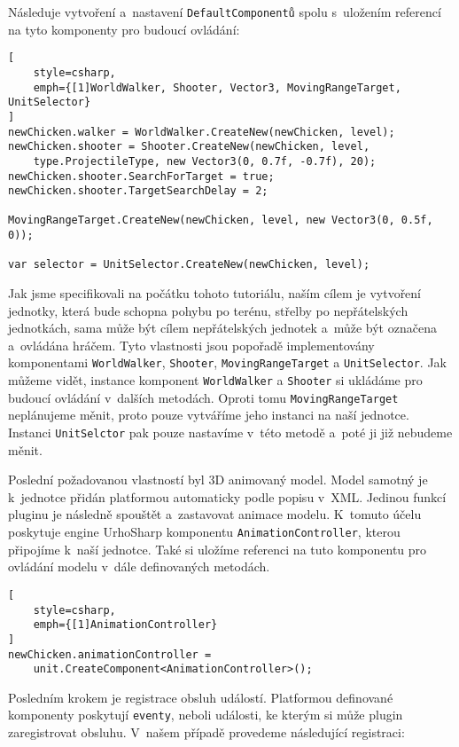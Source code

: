 Následuje vytvoření a~nastavení \texttt{DefaultComponentů} spolu s~uložením referencí na tyto komponenty pro budoucí ovládání:

\begin{lstlisting}[
	style=csharp,
	emph={[1]WorldWalker, Shooter, Vector3, MovingRangeTarget, UnitSelector}
]
newChicken.walker = WorldWalker.CreateNew(newChicken, level);
newChicken.shooter = Shooter.CreateNew(newChicken, level,
	type.ProjectileType, new Vector3(0, 0.7f, -0.7f), 20);
newChicken.shooter.SearchForTarget = true;
newChicken.shooter.TargetSearchDelay = 2;

MovingRangeTarget.CreateNew(newChicken, level, new Vector3(0, 0.5f, 0));

var selector = UnitSelector.CreateNew(newChicken, level);
\end{lstlisting}

Jak jsme specifikovali na počátku tohoto tutoriálu, naším cílem je vytvoření jednotky, která bude schopna pohybu po terénu, střelby po nepřátelských jednotkách, sama může být cílem nepřátelských jednotek a~může být označena a~ovládána hráčem. Tyto vlastnosti jsou popořadě implementovány komponentami \texttt{WorldWalker}, \texttt{Shooter}, \texttt{MovingRangeTarget} a \texttt{UnitSelector}. Jak můžeme vidět, instance komponent \texttt{WorldWalker} a \texttt{Shooter} si ukládáme pro budoucí ovládání v~dalších metodách. Oproti tomu \texttt{MovingRangeTarget} neplánujeme měnit, proto pouze vytváříme jeho instanci na naší jednotce. Instanci \texttt{UnitSelctor} pak pouze nastavíme v~této metodě a~poté ji již nebudeme měnit.


Poslední požadovanou vlastností byl 3D animovaný model. Model samotný je k~jednotce přidán platformou automaticky podle popisu v~XML. Jedinou funkcí pluginu je následně spouštět a~zastavovat animace modelu. K~tomuto účelu poskytuje engine UrhoSharp komponentu \texttt{AnimationController}, kterou připojíme k~naší jednotce. Také si uložíme referenci na tuto komponentu pro ovládání modelu v~dále definovaných metodách.
\begin{lstlisting}[
	style=csharp,
	emph={[1]AnimationController}
]
newChicken.animationController = 		
	unit.CreateComponent<AnimationController>();
\end{lstlisting}

Posledním krokem je registrace obsluh událostí. Platformou definované komponenty poskytují \texttt{eventy}, neboli události, ke kterým si může plugin zaregistrovat obsluhu. V~našem případě provedeme následující registraci:

